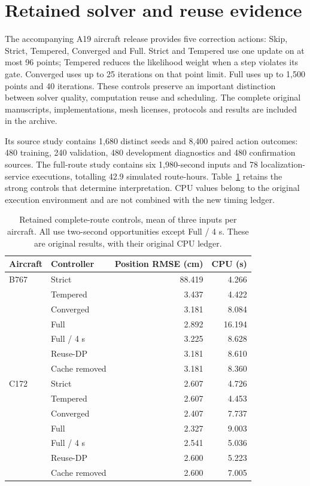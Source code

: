 \section{Retained solver and reuse evidence}\label{app:retained}
The accompanying A19 aircraft release provides five correction actions: Skip, Strict, Tempered, Converged and Full. Strict and Tempered use one update on at most 96 points; Tempered reduces the likelihood weight when a step violates its gate. Converged uses up to 25 iterations on that point limit. Full uses up to 1,500 points and 40 iterations. These controls preserve an important distinction between solver quality, computation reuse and scheduling. The complete original manuscripts, implementations, mesh licenses, protocols and results are included in the archive.

Its source study contains 1,680 distinct seeds and 8,400 paired action outcomes: 480 training, 240 validation, 480 development diagnostics and 480 confirmation sources. The full-route study contains six 1,980-second inputs and 78 localization-service executions, totalling 42.9 simulated route-hours. Table~\ref{tab:retained} retains the strong controls that determine interpretation. CPU values belong to the original execution environment and are not combined with the new timing ledger.

\begin{table}[t]\centering\small
\caption{Retained complete-route controls, mean of three inputs per aircraft. All use two-second opportunities except Full / 4 s. These are original results, with their original CPU ledger.}\label{tab:retained}
\begin{tabular}{@{}llrr@{}}\toprule
Aircraft & Controller & Position RMSE (cm)& CPU (s)\\\midrule
B767&Strict&88.419&4.266\\
&Tempered&3.437&4.422\\
&Converged&3.181&8.084\\
&Full&2.892&16.194\\
&Full / 4 s&3.225&8.628\\
&Reuse-DP&3.181&8.610\\
&Cache removed&3.181&8.360\\\midrule
C172&Strict&2.607&4.726\\
&Tempered&2.607&4.453\\
&Converged&2.407&7.737\\
&Full&2.327&9.003\\
&Full / 4 s&2.541&5.036\\
&Reuse-DP&2.600&5.223\\
&Cache removed&2.600&7.005\\\bottomrule
\end{tabular}
\end{table}

